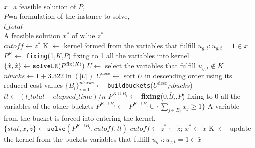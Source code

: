 \begin{algorithm}[htb]
\small
\caption{\texttt{kernelsearch()}}
\label{alg:KS}
\begin{algorithmic}
\Require \\
$\bar{x}$=a feasible solution of $P$, \\
$P$=a formulation of the instance to solve,\\
$\textit{t\_total}$
\Ensure \\
A feasible solution $x^{*}$ of value $z^{*}$ \\

    \State $\textit{cutoff} \leftarrow z^{*}$ 
    \State K $\leftarrow$ kernel formed from the variables that fulfill $u_{g,t}:u_{g,t}=1\in\bar{x}$ 
    \State $ P^{ K}\leftarrow$ \texttt{fixing}(1,$K$,$P$) fixing to 1 all the variables into kernel
    \State $\lbrace \hat{x}, \hat{z} \rbrace \leftarrow \texttt{solveLR}( P^{\text{fix(\textit{K})}})$ 
    \State $U \leftarrow$ select the variables that fulfill ${u}_{g,t}\notin K$
    \State $\textit{nbucks} \leftarrow 1 + 3.322 \ln(|\textit{U}|)$
    \State $U^{\text{desc}} \leftarrow$ sort $U$ in descending order using its reduced cost values 
    \State $\{ B_i\}_{i=1}^{\textit{nbucks}} \leftarrow$ \texttt{buildbuckets}($U^{\text{desc}}$,$\textit{nbucks}$)  
    \State $tl \leftarrow (\textit{t\_total}-\textit{elapsed\_time}) / n$ 
    \State \hfill{}
            \State $ P^{ K\cup B_i}\leftarrow$ \textbf{fixing}(0,$\overline{B}_i$,$P$) fixing to 0 all the variables of the other buckets
            \State $ P^{ K\cup B_i}\leftarrow$ $ P^{ K\cup B_i} \cup \lbrace \sum_{j\in B_{i}}x_{j} \geq 1\rbrace $ A variable from the bucket is forced into entering the kernel.
            \State $\lbrace stat, \widetilde{x}, \widetilde{z} \rbrace \leftarrow \texttt{solve}( P^{ K\cup B_i}, \textit{cutoff},tl)$
                 \State $  \textit{cutoff} \leftarrow z^{*} \leftarrow \widetilde{z}$; $x^* \leftarrow \widetilde{x}$
                \EndIf
                \State K $\leftarrow$ update the kernel from the buckets variables that fulfill $u_{g,t}:u_{g,t}=1\in\bar{x}$
            \EndIf
    \EndFor
\EndWhile\\
\end{algorithmic}
\end{algorithm}          



